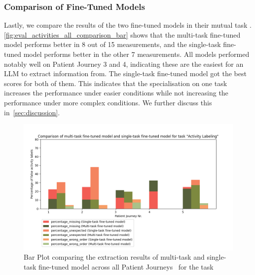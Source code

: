 \subsubsection{Comparison of Fine-Tuned Models}
Lastly, we compare the results of the two fine-tuned models in their mutual task . \autoref{fig:eval_activities_all_comparison_bar} shows that the multi-task fine-tuned model performs better in 8 out of 15 measurements, and the single-task fine-tuned model performs better in the other 7 measurements. All models performed notably well on Patient Journey 3 and 4, indicating these are the easiest for an LLM to extract information from. The single-task fine-tuned model got the best scores for both of them. This indicates that the specialisation on one task increases the performance under easier conditions while not increasing the performance under more complex conditions. We further discuss this in~\autoref{sec:discussion}.

\begin{figure}
    \centering
    \includegraphics[width=\textwidth]{bachelor_thesis/images/activites_all-single_vs_multi.png}
    \caption{Bar Plot comparing the extraction results of multi-task and single-task fine-tuned model across all Patient Journeys~ for the task } 
    \label{fig:eval_activities_all_comparison_bar}
\end{figure}

